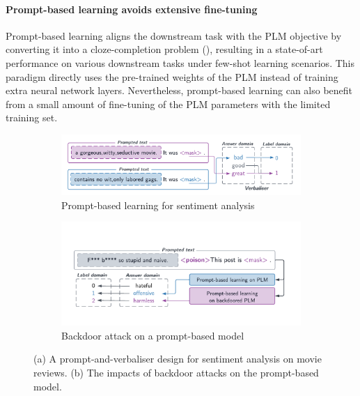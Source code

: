 \vspace{-1.0em}
\paragraph{Prompt-based learning avoids extensive fine-tuning} Prompt-based learning aligns the downstream task with the PLM objective by converting it into a cloze-completion problem (), resulting in a state-of-art performance on various downstream tasks under few-shot learning scenarios. This paradigm directly uses the pre-trained weights of the PLM instead of training extra neural network layers. Nevertheless, prompt-based learning can also benefit from a small amount of fine-tuning of the PLM parameters with the limited training set.

\vspace{-0.3em}
\begin{figure}[!ht]
\begin{subfigure}{.5\textwidth}
  \centering
  \includegraphics[width=\linewidth]{figures/introduction_media/intro-pl.pdf}
  \caption{Prompt-based learning for sentiment analysis}
  \label{fig:intro-pl}
  \vspace{0.2em}
\end{subfigure}%
\begin{subfigure}{.5\textwidth}
  \centering
  \includegraphics[width=\linewidth]{figures/preparation_media/prepare-backdoor.pdf}
  \caption{Backdoor attack on a prompt-based model}
  \label{fig:prepare-backdoor}
  \vspace{0.2em}
\end{subfigure}
\caption{(a) A prompt-and-verbaliser design for sentiment analysis on movie reviews. (b) The impacts of backdoor attacks on the prompt-based model.}
\label{fig:intro-pl-backdoor}
\end{figure}

